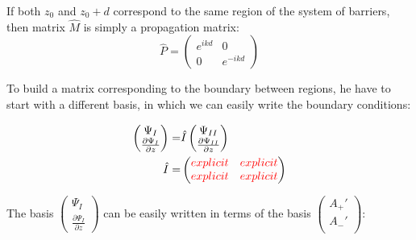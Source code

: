 			If both $z_0$ and $z_0 + d$ correspond to the same region of the system of barriers, then matrix $\hat{M}$ is simply a propagation matrix:
			\begin{equation}
				\hat{P} = \begin{pmatrix}
				e^{ikd} & 0 \\
				0		& e^{-ikd}
				\end{pmatrix}
			\end{equation}
			
			To build a matrix corresponding to the boundary between regions, he have to start with a different basis, in which we can easily write the boundary conditions:
			
			\begin{align}
				\begin{pmatrix}	
					\Psi_{I} \\
					\frac{\partial \Psi_{I}}{\partial z}
				\end{pmatrix} =& 
				\hat{I} \begin{pmatrix}	
					\Psi_{II} \\
					\frac{\partial \Psi_{II}}{\partial z}
				\end{pmatrix} \\
				\hat{I} =& \begin{pmatrix}
					\textcolor{red}{explicit} & \textcolor{red}{explicit} \\
					\textcolor{red}{explicit} & \textcolor{red}{explicit} 					
					\end{pmatrix}
			\end{align}
			
			The basis	$\left(\begin{smallmatrix}	
				\Psi_{I} \\
				\frac{\partial \Psi_{I}}{\partial z}
			\end{smallmatrix}\right)$ can be easily written in terms of the basis $\left(\begin{smallmatrix}
				A_+' \\
				A_-' \\
			\end{smallmatrix}\right)$:
			
